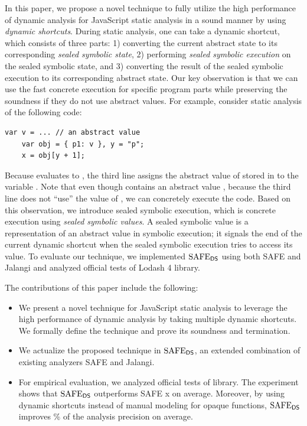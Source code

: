 In this paper, we propose a novel technique to fully utilize
the high performance of dynamic analysis for JavaScript static
analysis in a sound manner by using \textit{dynamic shortcuts}.
During static analysis, one can take a dynamic shortcut, which
consists of three parts: 1) converting the current abstract state to
its corresponding \textit{sealed symbolic state}, 2) performing
\textit{sealed symbolic execution} on the sealed symbolic state, and
3) converting the result of the sealed symbolic execution to its
corresponding abstract state.  Our key observation is that we can use
the fast concrete execution for specific program parts while
preserving the soundness if they do not use abstract values.
For example, consider static analysis of the following code:
\begin{lstlisting}[style=myJSstyle,numbers=none]
    var v = ... // an abstract value
    var obj = { p1: v }, y = "p";
    x = obj[y + 1];
\end{lstlisting}
Because  evaluates to ,
the third line assigns the abstract value of  stored in
 to the variable .
Note that even though  contains an abstract value ,
because the third line does not ``use'' the value of ,
we can concretely execute the code.  Based on this observation,
we introduce sealed symbolic execution, which is concrete execution
using \textit{sealed symbolic values}.  A sealed symbolic value is a
representation of an abstract value in symbolic execution; it signals
the end of the current dynamic shortcut when the sealed symbolic
execution tries to access its value.
To evaluate our technique, we implemented $\text{SAFE}_{\textsf{DS}}$ using both SAFE
and Jalangi and analyzed  official tests of Lodash 4 library.

The contributions of this paper include the following:
\begin{itemize}
\item We present a novel technique for JavaScript static
analysis to leverage the high performance of dynamic analysis by taking
multiple dynamic shortcuts.  We formally define the technique and prove
its soundness and termination.
\item We actualize the proposed technique in $\text{SAFE}_{\textsf{DS}}$, an
extended combination of existing analyzers SAFE and Jalangi.
\item For empirical evaluation, we analyzed  official tests of
 library.  The experiment shows that $\text{SAFE}_{\textsf{DS}}$ outperforms
SAFE x on average.  Moreover, by using dynamic shortcuts
instead of manual modeling for  opaque functions,
$\text{SAFE}_{\textsf{DS}}$ improves \% of the analysis precision on average.
\end{itemize}


